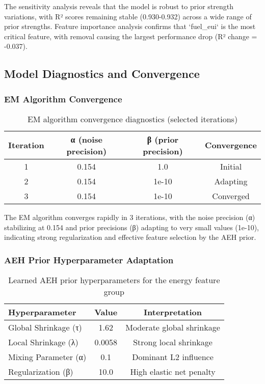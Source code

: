 The sensitivity analysis reveals that the model is robust to prior strength variations, with R² scores remaining stable (0.930-0.932) across a wide range of prior strengths. Feature importance analysis confirms that `fuel\_eui` is the most critical feature, with removal causing the largest performance drop (R² change = -0.037).

\subsection{Model Diagnostics and Convergence}

\subsubsection{EM Algorithm Convergence}

\begin{table}[ht]
\centering
\caption{EM algorithm convergence diagnostics (selected iterations)}
\label{tab:em_convergence}
\begin{tabular}{|c|c|c|c|}
\hline
\textbf{Iteration} & \textbf{α (noise precision)} & \textbf{β (prior precision)} & \textbf{Convergence} \\
\hline
1 & 0.154 & 1.0 & Initial \\
2 & 0.154 & 1e-10 & Adapting \\
3 & 0.154 & 1e-10 & Converged \\
\hline
\end{tabular}
\end{table}

The EM algorithm converges rapidly in 3 iterations, with the noise precision (α) stabilizing at 0.154 and prior precisions (β) adapting to very small values (1e-10), indicating strong regularization and effective feature selection by the AEH prior.

\subsubsection{AEH Prior Hyperparameter Adaptation}

\begin{table}[ht]
\centering
\caption{Learned AEH prior hyperparameters for the energy feature group}
\label{tab:aeh_hyperparameters}
\begin{tabular}{|l|c|c|}
\hline
\textbf{Hyperparameter} & \textbf{Value} & \textbf{Interpretation} \\
\hline
Global Shrinkage (τ) & 1.62 & Moderate global shrinkage \\
Local Shrinkage (λ) & 0.0058 & Strong local shrinkage \\
Mixing Parameter (α) & 0.1 & Dominant L2 influence \\
Regularization (β) & 10.0 & High elastic net penalty \\
\hline
\end{tabular}
\end{table}

